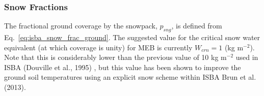 \subsubsection{Snow Fractions}
\label{sec:snow_frac} 

%
The fractional ground coverage by the snowpack, $p_{sng}$, 
is defined from Eq.~\ref{eq:isba_snow_frac_ground}.
%
%
The suggested value for the critical snow water equivalent (at which
coverage is unity) for MEB
is currently $W_{crn}=1$ (kg m$^{-2}$).
Note that this is considerably lower than the previous value of 10 kg m$^{-2}$
used in ISBA 
(Douville et al., 1995)
\nocite{DOUVILLE1995a}, 
but this value has been shown to improve the ground soil
temperatures  using an explicit snow scheme within 
ISBA 
Brun et al. (2013)\nocite{brun_2012}.

